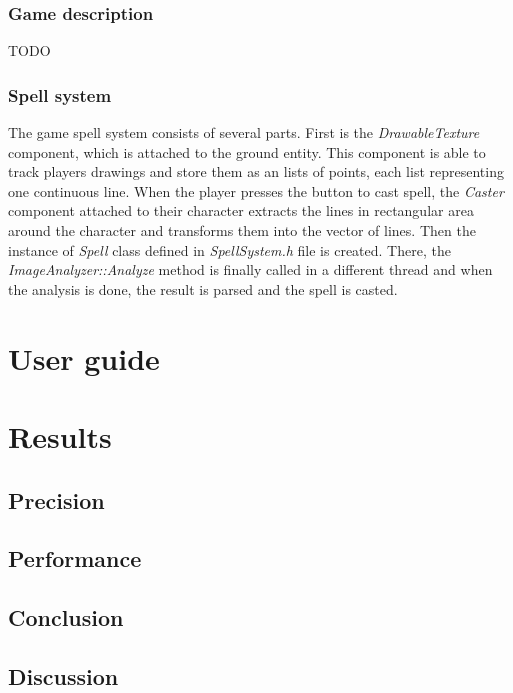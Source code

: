 \subsection{Game description}
TODO

\subsection{Spell system}
The game spell system consists of several parts. First is the \emph{DrawableTexture} component, which is attached to the ground entity. This component is able to track players drawings and store them as an lists of points, each list representing one continuous line. When the player presses the button to cast spell, the \emph{Caster} component attached to their character extracts the lines in rectangular area around the character and transforms them into the vector of lines. Then the instance of \emph{Spell} class defined in \emph{SpellSystem.h} file is created. There, the \emph{ImageAnalyzer::Analyze} method is finally called in a different thread and when the analysis is done, the result is parsed and the spell is casted.

\chapter{User guide}

\chapter{Results}

\section{Precision}

\section{Performance}

\section{Conclusion}

\section{Discussion}

